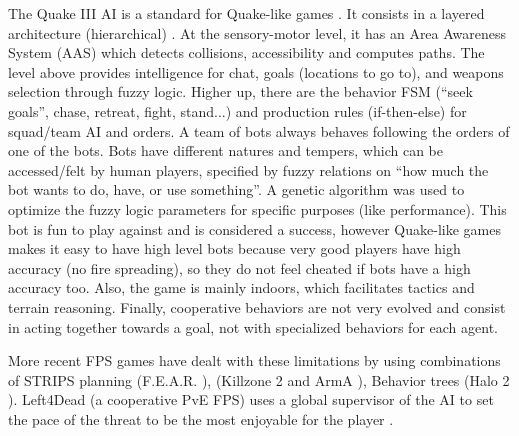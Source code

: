 The Quake III AI is a standard for Quake-like games \citep{waveren-02-artificial}. It consists in a layered architecture (hierarchical) . At the sensory-motor level, it has an Area Awareness System (AAS) which detects collisions, accessibility and computes paths. The level above provides intelligence for chat, goals (locations to go to), and weapons selection through fuzzy logic. Higher up, there are the behavior FSM (``seek goals'', chase, retreat, fight, stand...) and production rules (if-then-else) for squad/team AI and orders. A team of bots always behaves following the orders of one of the bots. Bots have different natures and tempers, which can be accessed/felt by human players, specified by fuzzy relations on ``how much the bot wants to do, have, or use something''. A genetic algorithm was used to optimize the fuzzy logic parameters for specific purposes (like performance). This bot is fun to play against and is considered a success, however Quake-like games makes it easy to have high level bots because very good players have high accuracy (no fire spreading), so they do not feel cheated if bots have a high accuracy too. Also, the game is mainly indoors, which facilitates tactics and terrain reasoning. Finally, cooperative behaviors are not very evolved and consist in acting together towards a goal, not with specialized behaviors for each agent.

More recent FPS games have dealt with these limitations by using combinations of STRIPS planning (F.E.A.R. \citep{orkinGDC_FEAR}),  (Killzone 2 \citep{Killzone2_HTN} and ArmA \citep{ArmA1_HTN}), Behavior trees (Halo 2 \citep{Isla}). Left4Dead (a cooperative PvE FPS) uses a global supervisor of the AI to set the pace of the threat to be the most enjoyable for the player \citep{left4dead2009}.%

